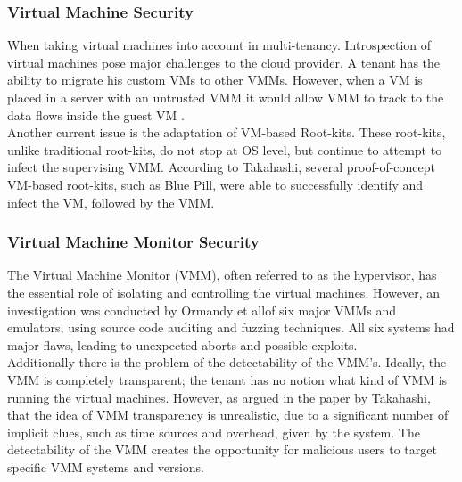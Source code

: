 \subsubsection{Virtual Machine Security}
When taking virtual machines into account in multi-tenancy. Introspection of virtual machines pose major challenges to the cloud provider. A tenant has the ability to migrate his custom VMs to other VMMs. However, when a VM is placed in a server with an untrusted VMM it would allow VMM to track to the data flows inside the guest VM \cite{Takahashi2012Security}. \\
Another current issue is the adaptation of VM-based Root-kits. These root-kits, unlike traditional root-kits, do not stop at OS level, but continue to attempt to infect the supervising VMM. According to Takahashi\cite{Takahashi2012Security}, several proof-of-concept VM-based root-kits, such as Blue Pill, were able to successfully identify and infect the VM, followed by the VMM.

\subsubsection{Virtual Machine Monitor Security}
The Virtual Machine Monitor (VMM), often referred to as the hypervisor, has the essential role of isolating and controlling the virtual machines. However, an investigation was conducted by Ormandy et all\cite{Ormandy2007}of six major VMMs and emulators, using source code auditing and fuzzing techniques. All six systems had major flaws, leading to unexpected aborts and possible exploits.\\
Additionally there is the problem of the detectability of the VMM’s. Ideally, the VMM is completely transparent; the tenant has no notion what kind of VMM is running the virtual machines. However, as argued in the paper by Takahashi\cite{Takahashi2012Security}, that the idea of VMM transparency is unrealistic, due to a significant number of implicit clues, such as time sources and overhead, given by the system. The detectability of the VMM creates the opportunity for malicious users to target specific VMM systems and versions.


